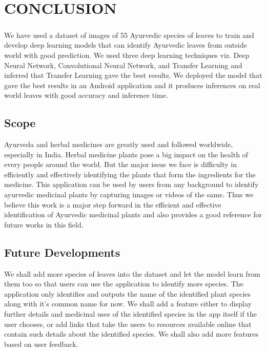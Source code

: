 \chapter{CONCLUSION}
\paragraph{}
We have used a dataset of images of 55 Ayurvedic species of leaves to train and develop deep learning models that can identify Ayurvedic leaves from outside world with good prediction. We used three deep learning techniques viz.  Deep Neural Network, Convolutional Neural Network, and Transfer Learning and inferred that Transfer Learning gave the best results. We deployed the model that gave the best results in an Android application and it produces inferences on real world leaves with good accuracy and inference time.

\section{Scope}
Ayurveda and herbal medicines are greatly used and followed worldwide, especially in India. Herbal medicine plants pose a big impact on the health of every people around the world.  But the major issue we face is difficulty in efficiently and effectively identifying the plants that form the ingredients for the medicine.
This application can be used by users from any background to identify ayurvedic medicinal plants by capturing images or videos of the same.
Thus we believe this work is a major step forward in the efficient and effective identification of Ayurvedic medicinal plants and also provides a good reference for future works in this field.

\section{Future Developments}
We shall add more species of leaves into the dataset and let the model learn from them too so that users can use the application to identify more species. The application only identifies and outputs the name of the identified plant species along with it's common name for now. We shall add a feature either to display further details and medicinal uses of the identified species in the app itself if the user chooses, or add links that take the users to resources available online that contain such details about the identified species. We shall also add more features based on user feedback.


